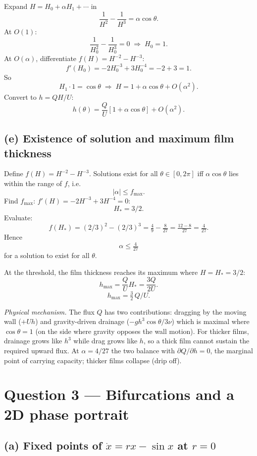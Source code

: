 \documentclass[11pt]{article}
\begin{document}
Expand $H = H_0 + \alpha H_1 + \cdots$ in
\[ \frac{1}{H^2} - \frac{1}{H^3} = \alpha\cos\theta. \]
At $O(1)$:
\[ \frac{1}{H_0^2} - \frac{1}{H_0^3} = 0 \;\Rightarrow\; H_0 = 1. \]
At $O(\alpha)$, differentiate $f(H) = H^{-2}-H^{-3}$:
\[ f'(H_0) = -2H_0^{-3}+3H_0^{-4} = -2+3 = 1. \]
So
\[ H_1\cdot 1 = \cos\theta \;\Rightarrow\; H = 1 + \alpha\cos\theta + O(\alpha^2). \]
Convert to $h = QH/U$:
\[ \boxed{\;h(\theta) = \frac{Q}{U}\!\left[1 + \alpha\cos\theta\right] + O(\alpha^2).\;} \]

\subsection*{(e) Existence of solution and maximum film thickness}

Define $f(H) = H^{-2} - H^{-3}$. Solutions exist for all $\theta\in[0,2\pi]$ iff $\alpha\cos\theta$ lies within the range of $f$, i.e.
\[ |\alpha| \le f_{\max}. \]
Find $f_{\max}$: $f'(H)=-2H^{-3}+3H^{-4}=0$:
\[ H_* = 3/2. \]
Evaluate:
\[ f(H_*) = (2/3)^2 - (2/3)^3 = \tfrac{4}{9} - \tfrac{8}{27} = \tfrac{12-8}{27} = \tfrac{4}{27}. \]
Hence
\[ \boxed{\;\alpha \le \tfrac{4}{27}\;} \]
for a solution to exist for all $\theta$.

At the threshold, the film thickness reaches its maximum where $H = H_* = 3/2$:
\[ h_{\max} = \frac{Q}{U}H_* = \frac{3Q}{2U}. \]
\[ \boxed{\;h_{\max} = \tfrac{3}{2}\,Q/U.\;} \]

\textit{Physical mechanism.} The flux $Q$ has two contributions: dragging by the moving wall ($+Uh$) and gravity-driven drainage ($-gh^3\cos\theta/3\nu$) which is maximal where $\cos\theta=1$ (on the side where gravity opposes the wall motion). For thicker films, drainage grows like $h^3$ while drag grows like $h$, so a thick film cannot sustain the required upward flux. At $\alpha = 4/27$ the two balance with $\partial Q/\partial h = 0$, the marginal point of carrying capacity; thicker films collapse (drip off).

\section*{Question 3 --- Bifurcations and a 2D phase portrait}

\subsection*{(a) Fixed points of $\dot x = rx-\sin x$ at $r=0$}
\end{document}
